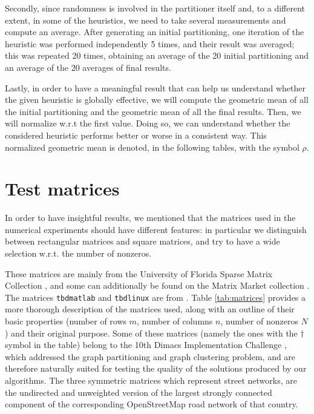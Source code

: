 Secondly, since randomness is involved in the partitioner itself and, to a different extent, in some of the heuristics, we need to take several measurements and compute an average. After generating an initial partitioning, one iteration of the heuristic was performed independently 5 times, and their result was averaged; this was repeated 20 times, obtaining an average of the 20 initial partitioning and an average of the 20 averages of final results. 

Lastly, in order to have a meaningful result that can help us understand whether the given heuristic is globally effective, we will compute the geometric mean of all the initial partitioning and the geometric mean of all the final results. Then, we will normalize w.r.t the first value. Doing so, we can understand whether the considered heuristic performs better or worse in a consistent way. This normalized geometric mean is denoted, in the following tables, with the symbol $\rho$.

\section{Test matrices} \label{sec:test_matrices}

In order to have insightful results, we mentioned that the matrices used in the numerical experiments should have different features: in particular we distinguish between rectangular matrices and square matrices, and try to have a wide selection w.r.t. the number of nonzeros. 

These matrices are mainly from the University of Florida Sparse Matrix Collection \cite{ufl}, and some can additionally be found on the Matrix Market collection \cite{matrixmarket}. The matrices \verb|tbdmatlab| and \verb|tbdlinux| are from \cite{mondriaan}. Table \ref{tab:matrices} provides a more thorough description of the matrices used, along with an outline of their basic properties (number of rows $m$, number of columns $n$, number of nonzeros $N$) and their original purpose. Some of these matrices (namely the ones with the $\dagger$ symbol in the table) belong to the 10th Dimacs Implementation Challenge \cite{dimacs}, which addressed the graph partitioning and graph clustering problem, and are therefore naturally suited for testing the quality of the solutions produced by our algorithms. The three symmetric matrices which represent street networks, are the undirected and unweighted version of the largest strongly connected component of the corresponding OpenStreetMap road network of that country.

